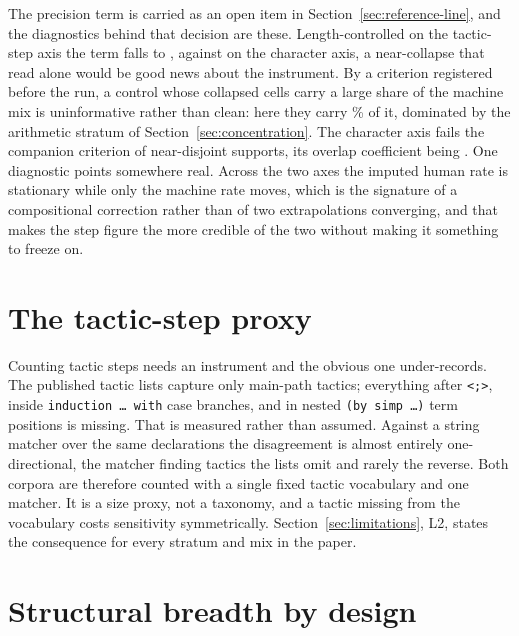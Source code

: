 The precision term is carried as an open item in
Section~\ref{sec:reference-line}, and the diagnostics behind that decision are
these. Length-controlled on the tactic-step axis the term falls to
\spuriousStepAxis{}, against \spuriousCharAxis{} on the character axis, a
near-collapse that read alone would be good news about the instrument. By a
criterion registered before the run, a control whose collapsed cells carry a
large share of the machine mix is uninformative rather than clean: here they
carry \spuriousCollapsedMachineMixPct{}\% of it, dominated by the arithmetic
stratum of Section~\ref{sec:concentration}. The character axis fails the
companion criterion of near-disjoint supports, its overlap coefficient being
\charOverlapSample{}. One diagnostic points somewhere real. Across the two
axes the imputed human rate is stationary while only the machine rate moves,
which is the signature of a compositional correction rather than of two
extrapolations converging, and that makes the step figure the more credible of
the two without making it something to freeze on.

\section{The tactic-step proxy}
\label{app:steps}

Counting tactic steps needs an instrument and the obvious one under-records.
The published tactic lists capture only main-path tactics; everything after
\texttt{<;>}, inside \texttt{induction \dots\ with} case branches, and in
nested \texttt{(by simp \dots)} term positions is missing. That is measured
rather than assumed. Against a string matcher over the same declarations the
disagreement is almost entirely one-directional, the matcher finding tactics
the lists omit and rarely the reverse. Both corpora are therefore counted with
a single fixed tactic vocabulary and one matcher. It is a size proxy, not a
taxonomy, and a tactic missing from the vocabulary costs sensitivity
symmetrically. Section~\ref{sec:limitations}, L2, states the consequence for
every stratum and mix in the paper.

\section{Structural breadth by design}
\label{app:breadth}

